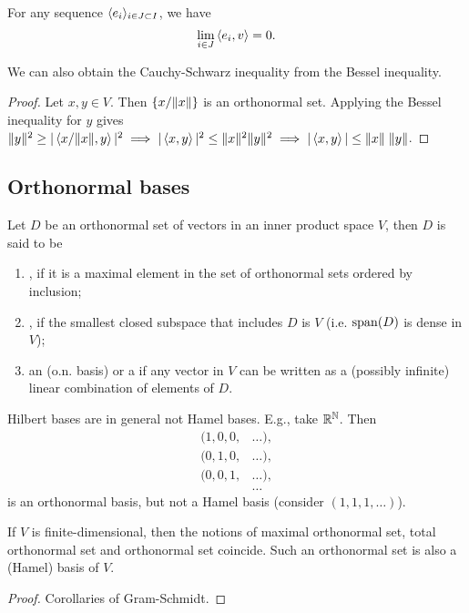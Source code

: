 \begin{corollary}
For any sequence $\langle e_i \rangle_{i\in J \subset I}$, we have
\[ \lim_{i\in J} \left\langle e_i,v \right\rangle = 0. \]
\end{corollary}

\begin{corollary}
We can also obtain the Cauchy-Schwarz inequality from the Bessel inequality.
\end{corollary}
\begin{proof}
Let $x,y\in V$. Then $\{x/\lVert x\rVert\}$ is an orthonormal set. Applying the Bessel inequality for $y$ gives $\lVert y\rVert^2 \geq |\left\langle x/\lVert x\rVert, y \right\rangle|^2 \implies |\left\langle x,y \right\rangle|^2\leq \lVert x\rVert^2\lVert y\rVert^2 \implies |\left\langle x,y \right\rangle| \leq \lVert x\rVert\;\lVert y\rVert$.
\end{proof}

\subsection{Orthonormal bases}
\begin{definition}
Let $D$ be an orthonormal set of vectors in an inner product space $V$, then $D$ is said to be
\begin{enumerate}
\item {}, if it is a maximal element in the set of orthonormal sets ordered by inclusion;
\item {}, if the smallest closed subspace that includes $D$ is $V$ (i.e. $\operatorname{span}(D)$ is dense in $V$);
\item an  (o.n. basis) or a  if any vector in $V$ can be written as a (possibly infinite) linear combination of elements of $D$.
\end{enumerate}
\end{definition}
\begin{note}
Hilbert bases are in general not Hamel bases.  E.g., take $\mathbb{R}^\mathbb{N}$. Then 
\begin{align*}
(1,0,0,&\ldots), \\
(0,1,0,&\ldots), \\
(0,0,1,&\ldots), \\
&\ldots
\end{align*}
is an orthonormal basis, but not a Hamel basis (consider $(1,1,1,\ldots)$).
\end{note}

\begin{proposition}
If $V$ is finite-dimensional, then the notions of maximal orthonormal set, total orthonormal set and orthonormal set coincide. Such an orthonormal set is also a (Hamel) basis of $V$.
\end{proposition}
\begin{proof}
Corollaries of Gram-Schmidt.
\end{proof}

